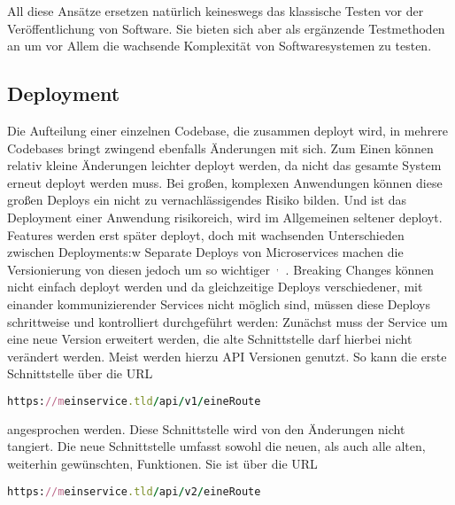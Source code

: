 All diese Ansätze ersetzen natürlich keineswegs das klassische Testen vor der Veröffentlichung von Software. Sie bieten sich aber als ergänzende Testmethoden an um vor Allem die wachsende Komplexität von Softwaresystemen zu testen.

\subsection{Deployment}
Die Aufteilung einer einzelnen Codebase, die zusammen deployt wird, in mehrere Codebases bringt zwingend ebenfalls Änderungen mit sich.
Zum Einen können relativ kleine Änderungen leichter deployt werden, da nicht das gesamte System erneut deployt werden muss. Bei großen, komplexen Anwendungen können diese großen Deploys ein nicht zu vernachlässigendes Risiko bilden. Und ist das Deployment einer Anwendung risikoreich, wird im Allgemeinen seltener deployt. Features werden erst später deployt, doch mit wachsenden Unterschieden zwischen Deployments:w
Separate Deploys von Microservices machen die Versionierung von diesen jedoch um so wichtiger~\cite[vgl.][Seite 62]{newman2015building}$^,$~\cite[vgl.][]{Vergleichsartikel}. Breaking Changes können nicht einfach deployt werden und da gleichzeitige Deploys verschiedener, mit einander kommunizierender Services nicht möglich sind, müssen diese Deploys schrittweise und kontrolliert durchgeführt werden: Zunächst muss der Service um eine neue Version erweitert werden, die alte Schnittstelle darf hierbei nicht verändert werden. Meist werden hierzu API Versionen genutzt. So kann die erste Schnittstelle über die URL

\begin{lstlisting}[language=Ruby]
https://meinservice.tld/api/v1/eineRoute
\end{lstlisting}

\noindent angesprochen werden. Diese Schnittstelle wird von den Änderungen nicht tangiert. Die neue Schnittstelle umfasst sowohl die neuen, als auch alle alten, weiterhin gewünschten, Funktionen. Sie ist über die URL

\begin{lstlisting}[language=Ruby]
https://meinservice.tld/api/v2/eineRoute
\end{lstlisting}

